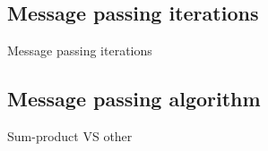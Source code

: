 \documentclass{beamer}
\begin{document}
\begin{darkframes}
  \subsection{Message passing iterations}
  \begin{frame}{Message passing iterations}
  \end{frame}

  \subsection{Message passing algorithm}
  \begin{frame}{Sum-product VS other}
  \end{frame}

\end{darkframes}
\end{document}
